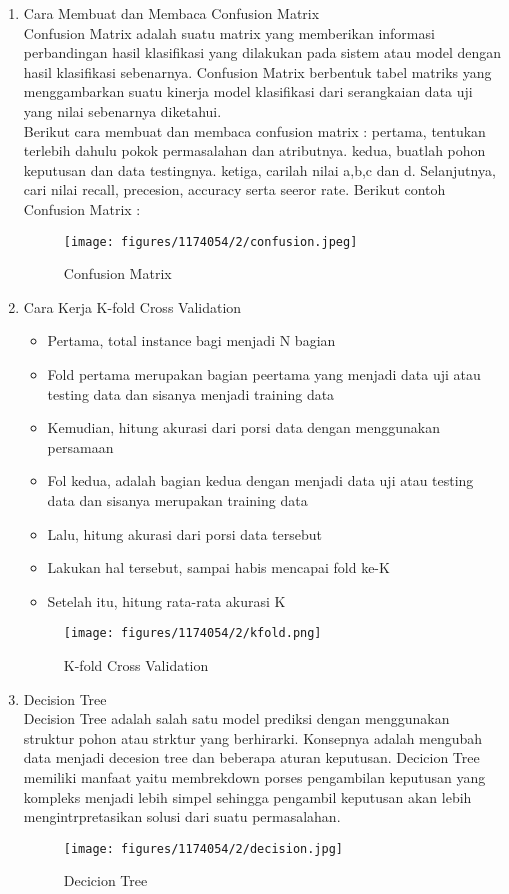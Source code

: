 \begin{enumerate}
\item Cara Membuat dan Membaca Confusion Matrix \\
Confusion Matrix adalah suatu matrix yang memberikan informasi perbandingan hasil klasifikasi yang dilakukan pada sistem atau model dengan hasil klasifikasi sebenarnya. Confusion Matrix berbentuk tabel matriks yang menggambarkan suatu kinerja model klasifikasi dari serangkaian data uji yang nilai sebenarnya diketahui. \\
Berikut cara membuat dan membaca confusion matrix : pertama, tentukan terlebih dahulu pokok permasalahan dan atributnya. kedua, buatlah pohon keputusan dan data testingnya. ketiga, carilah nilai a,b,c dan d. Selanjutnya, cari nilai recall, precesion, accuracy serta seeror rate. Berikut contoh Confusion Matrix :
\begin{figure}[H]
		\texttt{[image: figures/1174054/2/confusion.jpeg]}
		\centering
		\caption{Confusion Matrix}
\end{figure}

\item Cara Kerja K-fold Cross Validation 
\begin{itemize}
\item Pertama, total instance bagi menjadi N bagian
\item Fold pertama merupakan bagian peertama yang menjadi data uji atau testing data dan sisanya menjadi training data
\item Kemudian, hitung akurasi dari porsi data dengan menggunakan persamaan
\item Fol kedua, adalah bagian kedua dengan menjadi data uji atau testing data dan sisanya merupakan training data
\item Lalu, hitung akurasi dari porsi data tersebut
\item Lakukan hal tersebut, sampai habis mencapai fold ke-K
\item Setelah itu, hitung rata-rata akurasi K
\end{itemize}
\begin{figure}[H]
		\texttt{[image: figures/1174054/2/kfold.png]}
		\centering
		\caption{K-fold Cross Validation}
\end{figure}

\item Decision Tree \\
Decision Tree adalah salah satu model prediksi dengan menggunakan struktur pohon atau strktur yang berhirarki. Konsepnya adalah mengubah data menjadi decesion tree dan beberapa aturan keputusan. Decicion Tree memiliki manfaat yaitu membrekdown porses pengambilan keputusan yang kompleks menjadi lebih simpel sehingga pengambil keputusan akan lebih mengintrpretasikan solusi dari suatu permasalahan.
\begin{figure}[H]
		\texttt{[image: figures/1174054/2/decision.jpg]}
		\centering
		\caption{Decicion Tree}
\end{figure}


\end{enumerate}
